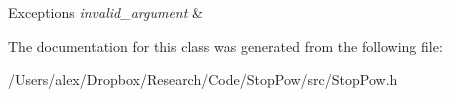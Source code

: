 \begin{DoxyExceptions}{Exceptions}
{\em invalid\-\_\-argument} & \\
\hline
\end{DoxyExceptions}


The documentation for this class was generated from the following file\-:\begin{DoxyCompactItemize}
\item 
/\-Users/alex/\-Dropbox/\-Research/\-Code/\-Stop\-Pow/src/Stop\-Pow.\-h\end{DoxyCompactItemize}
